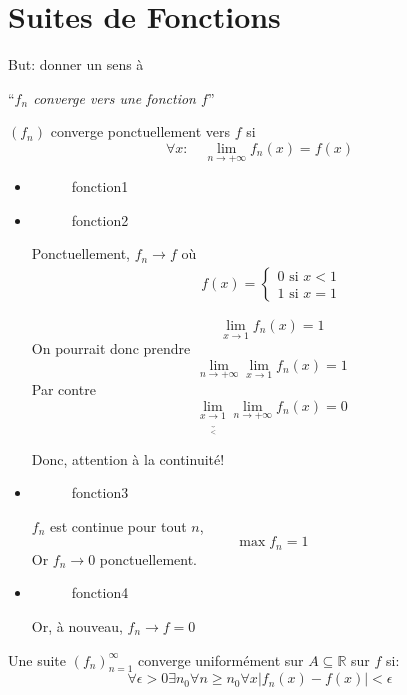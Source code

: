 \documentclass[../main.tex]{subfiles}
\begin{document}
\section{Suites de Fonctions}
But: donner un sens à 
\begin{center}
``\textit{$f_n$ converge vers une fonction $f$}''
\end{center}
\begin{defn}
	$( f_n)$ converge ponctuellement vers $f$ si
	\[ 
		\forall x : \quad \lim_{n \to  + \infty} f_n( x) = f( x) 
	\]
\end{defn}
\begin{exemple}
\begin{itemize}
\item 
\begin{figure}[ht]
    \centering
    \caption{fonction1}
    \label{fig:fonction1}
\end{figure}
\item 
\begin{figure}[ht]
    \centering
    \caption{fonction2}
    \label{fig:fonction2}
\end{figure}
Ponctuellement, $f_n \to f$ où
\begin{align*}
	f( x) =
	\begin{cases}
	0 \text{ si } x<1\\
	1 \text{ si } x=1
	\end{cases}
\end{align*}
\begin{rmq}
\[ 
	\lim_{x \to 1} f_n( x) = 1
\]
On pourrait donc prendre
\[ 
	\lim_{n \to  + \infty} \lim_{x \to 1} f_n( x) = 1
\]
Par contre
\[ 
	\lim_{x \underbrace{\to}_{<} 1} \lim_{n \to  + \infty} f_n( x)  = 0
\]

\end{rmq}
Donc, attention à la continuité!
\item 
\begin{figure}[ht]
    \centering
    \caption{fonction3}
    \label{fig:fonction3}
\end{figure}
$f_n$ est continue pour tout $n$, 
\[ 
\max f_n = 1
\]
Or $f_n \to 0$ ponctuellement.
\item 
\begin{figure}[ht]
    \centering
    \caption{fonction4}
    \label{fig:fonction4}
\end{figure}
Or, à nouveau, $f_n \to f=0$

\end{itemize}
\end{exemple}
\begin{defn}
	Une suite $( f_n) _{n=1} ^{ \infty }$ converge uniformément sur $A \subseteq \mathbb{R}$ sur $f$ si:
	\[ 
		\forall \epsilon > 0 \exists n_0 \forall n \geq n_0 \forall x |f_n( x) - f( x) | < \epsilon
	\]
	

\end{defn}
\end{document}

